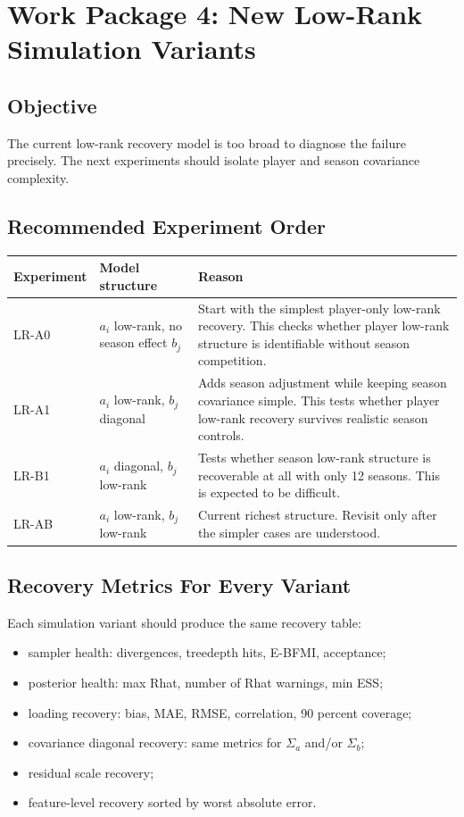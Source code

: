 \documentclass[11pt]{article}
\begin{document}
\section{Work Package 4: New Low-Rank Simulation Variants}

\subsection{Objective}

The current low-rank recovery model is too broad to diagnose the failure
precisely. The next experiments should isolate player and season covariance
complexity.

\subsection{Recommended Experiment Order}

\begin{longtable}{L{0.20\textwidth}L{0.26\textwidth}L{0.43\textwidth}}
\toprule
Experiment & Model structure & Reason \\
\midrule
\endhead
LR-A0 & \(a_i\) low-rank, no season effect \(b_j\) &
Start with the simplest player-only low-rank recovery. This checks whether
player low-rank structure is identifiable without season competition. \\
\addlinespace
LR-A1 & \(a_i\) low-rank, \(b_j\) diagonal &
Adds season adjustment while keeping season covariance simple. This tests
whether player low-rank recovery survives realistic season controls. \\
\addlinespace
LR-B1 & \(a_i\) diagonal, \(b_j\) low-rank &
Tests whether season low-rank structure is recoverable at all with only 12
seasons. This is expected to be difficult. \\
\addlinespace
LR-AB & \(a_i\) low-rank, \(b_j\) low-rank &
Current richest structure. Revisit only after the simpler cases are understood. \\
\bottomrule
\end{longtable}

\subsection{Recovery Metrics For Every Variant}

Each simulation variant should produce the same recovery table:

\begin{itemize}[leftmargin=*]
  \item sampler health: divergences, treedepth hits, E-BFMI, acceptance;
  \item posterior health: max Rhat, number of Rhat warnings, min ESS;
  \item loading recovery: bias, MAE, RMSE, correlation, 90 percent coverage;
  \item covariance diagonal recovery: same metrics for \(\Sigma_a\) and/or
  \(\Sigma_b\);
  \item residual scale recovery;
  \item feature-level recovery sorted by worst absolute error.
\end{itemize}
\end{document}
